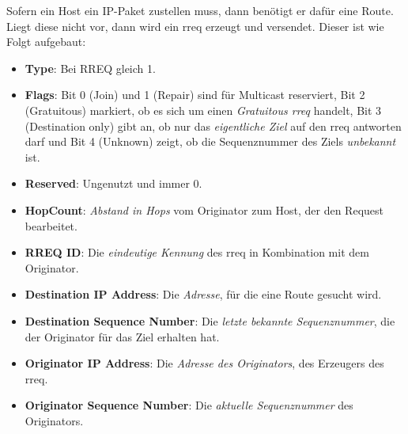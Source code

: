 Sofern ein Host ein IP-Paket zustellen muss, dann benötigt er dafür eine Route. Liegt diese nicht vor, dann wird ein \gls{rreq} erzeugt und versendet. Dieser ist wie Folgt aufgebaut:

\begin{itemize}
\item \textbf{Type}: Bei RREQ gleich 1.
\item \textbf{Flags}:  Bit 0 (Join) und 1 (Repair) sind für Multicast reserviert, Bit 2 (Gratuitous) markiert, ob es sich um einen \textit{Gratuitous \gls{rreq}} handelt, Bit 3 (Destination only) gibt an, ob nur das \textit{eigentliche Ziel} auf den \gls{rreq} antworten darf und Bit 4 (Unknown) zeigt, ob die Sequenznummer des Ziels \textit{unbekannt} ist.
\item \textbf{Reserved}: Ungenutzt und immer 0.
\item \textbf{HopCount}: \textit{Abstand in Hops} vom Originator zum Host, der den Request bearbeitet.
\item \textbf{RREQ ID}: Die \textit{eindeutige Kennung} des \gls{rreq} in Kombination mit dem Originator.
\item \textbf{Destination IP Address}: Die \textit{Adresse}, für die eine Route gesucht wird.
\item \textbf{Destination Sequence Number}: Die \textit{letzte bekannte Sequenznummer}, die der Originator für das Ziel erhalten hat.
\item \textbf{Originator IP Address}: Die \textit{Adresse des Originators}, des Erzeugers des \gls{rreq}.
\item \textbf{Originator Sequence Number}: Die \textit{aktuelle Sequenznummer} des Originators.
\end{itemize}

